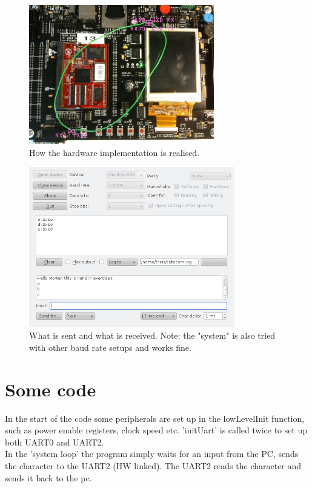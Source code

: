 \begin{figure}[h!]		%
 \begin{centering}
  \includegraphics[width=0.72\textwidth]{setup.jpg}
   \caption{How the hardware implementation is realised.}
 \end{centering}
\end{figure}
\newpage
\begin{figure}[h!]		%
 \begin{centering}
  \includegraphics[width=0.8\textwidth]{uart.png}
   \caption{What is sent and what is received. Note: the "system" is also tried with other baud rate setups and works fine.}
 \end{centering}
\end{figure}

\section{Some code}
In the start of the code some peripherals are set up in the lowLevelInit function, such as power enable registers, clock speed etc.
'initUart' is called twice to set up both UART0 and UART2.\\
In the 'system loop' the program simply waits for an input from the PC, sends the character to the UART2 (HW linked).
The UART2 reads the character and sends it back to the pc.

